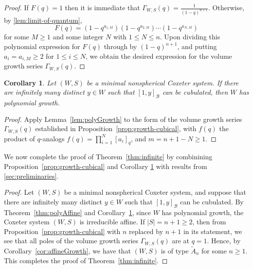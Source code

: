 \documentclass[11pt]{amsart}
\theoremstyle{plain}
\newtheorem{corollary}[thm]{Corollary}
\theoremstyle{definition}
\newcommand{\cB}{\mathcal B}
\newcommand{\G}{\Gamma} %
\numberwithin{equation}{subsection}
\begin{document}
\begin{proof}
	If $F(q) = 1$ then it is immediate that $\displaystyle \G_{W,S}(q) = \frac{1}{(1-q)^{n+1}}$. Otherwise, by \cref{lem:limit-of-quantum},
	\[
	F(q)
	=
	(1 - q^{a_{1,M}})
	(1 - q^{a_{2,M}})
	\cdots
	(1 - q^{a_{N,M}})
	\]
	for some $M \geq 1$ and some integer $N$ with $1 \leq N \leq n$.
	Upon dividing this polynomial expression for $F(q)$ through by $(1-q)^{n+1}$, and putting $a_i = a_{i,M} \geq 2$ for $1 \leq i \leq N$, we obtain the desired expression for the volume growth series $\G_{W,S}(q)$.	
\end{proof}

\begin{corollary}\label{cor:cubicalPoly}	Let $(W,S)$ be a minimal nonspherical Coxeter system. 
	If there are infinitely many distinct $y \in W$ such that $[1,y]_\cB$ can be cubulated, then $W$ has polynomial growth.
\end{corollary}
\begin{proof} Apply Lemma~\ref{lem:polyGrowth} to the form of the volume growth series $\G_{W,S}(q)$ established in  Proposition~\ref{prop:growth-cubical}, with $f(q)$ the product of %
  $q$-analogs
$
f(q) = 
\prod_{i=1}^N [a_i]_q
$, 
and $m = n+1 - N \geq 1$.
\end{proof}

We now complete the proof of Theorem~\ref{thm:infinite} by combinining Proposition~\ref{prop:growth-cubical} and Corollary \ref{cor:cubicalPoly} with results from %
\cref{sec:preliminaries}.

\MainTheoremC

\begin{proof}%
Let $(W,S)$ be a minimal nonspherical Coxeter system, and suppose that there are infinitely many distinct $y \in W$ such that $[1,y]_\cB$ can be cubulated.  By Theorem~\ref{thm:polyAffine} and Corollary~\ref{cor:cubicalPoly}, since $W$ has polynomial growth,  the Coxeter system $(W,S)$ is irreducible affine. 
If $|S| = n +1 \geq 2$, then from Proposition~\ref{prop:growth-cubical} with $n$ replaced by $n+1$ in its statement, we see that all poles of the volume growth series $\G_{W,S}(q)$ are at $q = 1$. Hence, by Corollary~\ref{cor:affineGrowth}, we have that $(W,S)$ is of type $\tilde{A}_n$ for some $n \geq 1$. This completes the proof of Theorem~\ref{thm:infinite}.
\end{proof}
\end{document}
